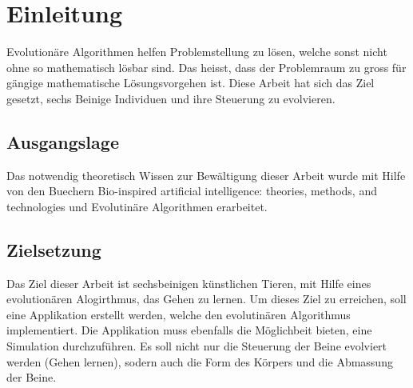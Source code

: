 %
%


\chapter{Einleitung}

Evolutionäre Algorithmen helfen Problemstellung zu lösen, welche sonst nicht ohne so mathematisch lösbar sind.
Das heisst, dass der Problemraum zu gross für gängige mathematische Lösungsvorgehen ist.
Diese Arbeit hat sich das Ziel gesetzt, sechs Beinige Individuen und ihre Steuerung zu evolvieren.

\section{Ausgangslage}

Das notwendig theoretisch Wissen zur Bewältigung dieser Arbeit wurde mit Hilfe von den Buechern
Bio-inspired artificial intelligence: theories, methods, and technologies \cite[]{book:bioInspired} und
Evolutinäre Algorithmen \cite[]{book:evAlgo} erarbeitet.

\section{Zielsetzung}
  Das Ziel dieser Arbeit ist sechsbeinigen künstlichen Tieren, mit Hilfe eines evolutionären Alogirthmus, das Gehen zu lernen.
  Um dieses Ziel zu erreichen, soll eine Applikation erstellt werden, welche den evolutinären Algorithmus implementiert.
  Die Applikation muss ebenfalls die Möglichbeit bieten, eine Simulation durchzuführen.
  Es soll nicht nur die Steuerung der Beine evolviert werden (Gehen lernen), sodern auch die Form des Körpers und die Abmassung der Beine.

  \begin{comment}
    Als Mass für die Fitness wird eine Funktion der Zeit verwendet, welche das Tier braucht,
    um einen gegebenen Parcours zurückzulegen.
    Dabei müssen Individuen berücksichtigt werden, die den Parcours nicht vollständig ablaufen können.
    Die Fitnessfunktion berücksichtigt in diesem Fall die zurückgelegte Strecke.
    \\
    Als Randbedingungen vorgegeben sind:
    \begin{enumerate}
      \item Forderung einer physikalisch sinnvollen Bewegung
      \item Obere Grenze für die total aufgewandte Energie
      \item Beschränkung der abgegebenen Leistung
    \end{enumerate}
    Damit die Forderung nach einer physikalischen Bewegung erfüllt werden kann,
    wird die Bewegung mit Hilfe einer Physik-Engine simuliert.
    Diese Engine wird von den Studierenden ausgewählt und kann als Blackbox verwendet werden.
  \end{comment}
